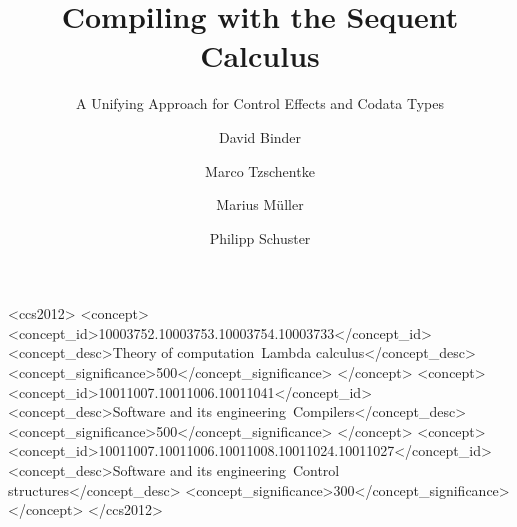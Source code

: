\documentclass[nonacm]{acmart}
\begin{document}
\title{Compiling with the Sequent Calculus}
\subtitle{A Unifying Approach
for Control Effects and Codata Types}



\begin{CCSXML}
  <ccs2012>
     <concept>
         <concept_id>10003752.10003753.10003754.10003733</concept_id>
         <concept_desc>Theory of computation~Lambda calculus</concept_desc>
         <concept_significance>500</concept_significance>
         </concept>
     <concept>
         <concept_id>10011007.10011006.10011041</concept_id>
         <concept_desc>Software and its engineering~Compilers</concept_desc>
         <concept_significance>500</concept_significance>
         </concept>
     <concept>
         <concept_id>10011007.10011006.10011008.10011024.10011027</concept_id>
         <concept_desc>Software and its engineering~Control structures</concept_desc>
         <concept_significance>300</concept_significance>
         </concept>
   </ccs2012>
\end{CCSXML}


\author{David Binder}

\author{Marco Tzschentke}

\author{Marius Müller}

\author{Philipp Schuster}
\end{document}
